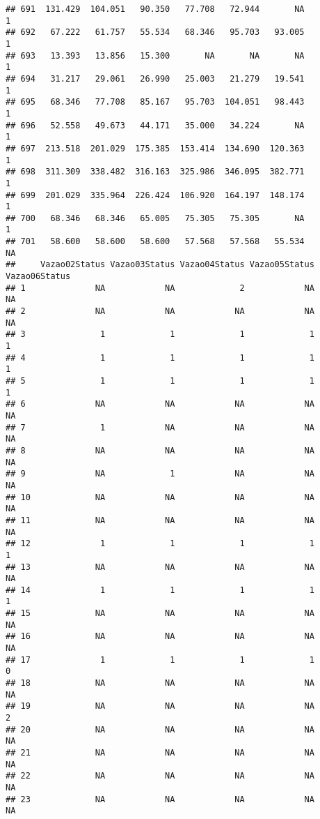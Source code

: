 \documentclass[
]{article}
\begin{document}
\begin{verbatim}
## 691  131.429  104.051   90.350   77.708   72.944       NA             1
## 692   67.222   61.757   55.534   68.346   95.703   93.005             1
## 693   13.393   13.856   15.300       NA       NA       NA             1
## 694   31.217   29.061   26.990   25.003   21.279   19.541             1
## 695   68.346   77.708   85.167   95.703  104.051   98.443             1
## 696   52.558   49.673   44.171   35.000   34.224       NA             1
## 697  213.518  201.029  175.385  153.414  134.690  120.363             1
## 698  311.309  338.482  316.163  325.986  346.095  382.771             1
## 699  201.029  335.964  226.424  106.920  164.197  148.174             1
## 700   68.346   68.346   65.005   75.305   75.305       NA             1
## 701   58.600   58.600   58.600   57.568   57.568   55.534            NA
##     Vazao02Status Vazao03Status Vazao04Status Vazao05Status Vazao06Status
## 1              NA            NA             2            NA            NA
## 2              NA            NA            NA            NA            NA
## 3               1             1             1             1             1
## 4               1             1             1             1             1
## 5               1             1             1             1             1
## 6              NA            NA            NA            NA            NA
## 7               1            NA            NA            NA            NA
## 8              NA            NA            NA            NA            NA
## 9              NA             1            NA            NA            NA
## 10             NA            NA            NA            NA            NA
## 11             NA            NA            NA            NA            NA
## 12              1             1             1             1             1
## 13             NA            NA            NA            NA            NA
## 14              1             1             1             1             1
## 15             NA            NA            NA            NA            NA
## 16             NA            NA            NA            NA            NA
## 17              1             1             1             1             0
## 18             NA            NA            NA            NA            NA
## 19             NA            NA            NA            NA             2
## 20             NA            NA            NA            NA            NA
## 21             NA            NA            NA            NA            NA
## 22             NA            NA            NA            NA            NA
## 23             NA            NA            NA            NA            NA

\end{verbatim}
\end{document}
